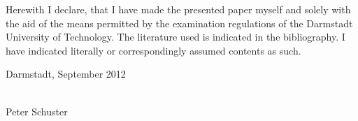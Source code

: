 \newpage

\thispagestyle{empty}
\cleardoublepage
\vspace*{9cm}

Herewith I declare, that I have made the presented paper myself and solely with the aid of the means permitted by the examination regulations of the Darmstadt University of Technology.
The literature used is indicated in the bibliography.
I have indicated literally or correspondingly assumed contents as such.

\vspace*{3cm}

Darmstadt, September 2012\\

\vspace*{5mm}


\parbox{7cm}{\hrulefill}\\
\hspace*{0,3cm} Peter Schuster

\cleardoublepage
\endinput
